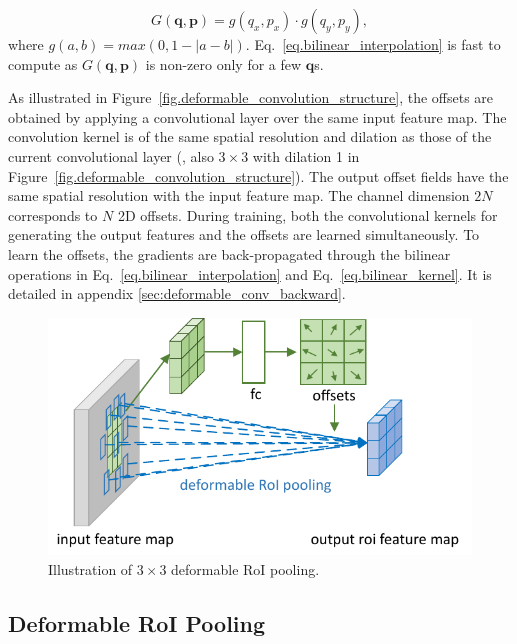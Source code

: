 \documentclass[10pt,twocolumn,letterpaper]{article}
\begin{document}
\begin{equation}
G(\mathbf{q},\mathbf{p})=g(q_x,p_x)\cdot g(q_y,p_y),
\label{eq.bilinear_kernel}
\end{equation}
where $g(a,b)=max(0,1-|a-b|)$. Eq.~\eqref{eq.bilinear_interpolation} is fast to compute as $G(\mathbf{q},\mathbf{p})$ is non-zero only for a few $\mathbf{q}$s.

As illustrated in Figure~\ref{fig.deformable_convolution_structure}, the offsets are obtained by applying a convolutional layer over the same input feature map. The convolution kernel is of the same spatial resolution and dilation as those of the current convolutional layer (\eg, also $3\times 3$ with dilation 1 in Figure~\ref{fig.deformable_convolution_structure}). The output offset fields have the same spatial resolution with the input feature map. The channel dimension $2N$ corresponds to $N$ 2D offsets. During training, both the convolutional kernels for generating the output features and the offsets are learned simultaneously. To learn the offsets, the gradients are back-propagated through the bilinear operations in Eq.~\eqref{eq.bilinear_interpolation} and Eq.~\eqref{eq.bilinear_kernel}. It is detailed in appendix \ref{sec:deformable_conv_backward}.

\begin{figure}
\centering
  \includegraphics[width=\linewidth]{deform_pool_layer_v6.pdf}
  \caption{Illustration of $3\times 3$ deformable RoI pooling.}
\label{fig.deformable_roi_pooling_structure}
\end{figure}

\subsection{Deformable RoI Pooling}
\label{sec.deformable_roi_pooling}
\end{document}
